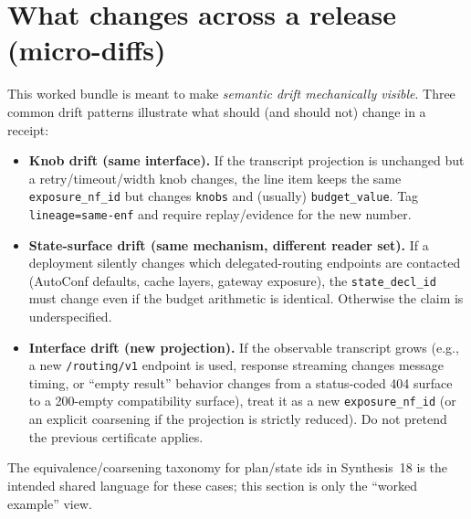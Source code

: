 \documentclass[11pt]{article}
\begin{document}
\section{What changes across a release (micro-diffs)}

This worked bundle is meant to make \emph{semantic drift mechanically visible}.
Three common drift patterns illustrate what should (and should not) change in a receipt:

\begin{itemize}[leftmargin=*]
\item \textbf{Knob drift (same interface).} If the transcript projection is unchanged but a retry/timeout/width knob changes, the line item keeps the same \texttt{exposure\_nf\_id} but changes \texttt{knobs} and (usually) \texttt{budget\_value}. Tag \texttt{lineage=same-enf} and require replay/evidence for the new number.\cite{series:receiptitems,series:planstateequiv}
\item \textbf{State-surface drift (same mechanism, different reader set).} If a deployment silently changes which delegated-routing endpoints are contacted (AutoConf defaults, cache layers, gateway exposure), the \texttt{state\_decl\_id} must change even if the budget arithmetic is identical. Otherwise the claim is underspecified.\cite{series:deployedsurfaces,series:planstateequiv}
\item \textbf{Interface drift (new projection).} If the observable transcript grows (e.g., a new \texttt{/routing/v1} endpoint is used, response streaming changes message timing, or ``empty result'' behavior changes from a status-coded 404 surface to a 200-empty compatibility surface), treat it as a new \texttt{exposure\_nf\_id} (or an explicit coarsening if the projection is strictly reduced). Do not pretend the previous certificate applies.\cite{series:traceifaces,series:receiptitems,series:deployedsurfaces}
\end{itemize}

The equivalence/coarsening taxonomy for plan/state ids in Synthesis~18 is the intended shared language for these cases; this section is only the ``worked example'' view.\cite{series:planstateequiv}
\end{document}
